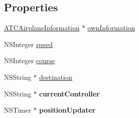 \subsection*{\-Properties}
\begin{DoxyCompactItemize}
\item 
\hyperlink{interface_a_t_c_airplane_information}{\-A\-T\-C\-Airplane\-Information} $\ast$ \hyperlink{interface_airplane_ae7aaedc8e578708c9658b88148015dfb}{own\-Information}
\item 
\-N\-S\-Integer \hyperlink{interface_airplane_a8dc93028dc827369e6f3d4944afa8ef4}{speed}
\item 
\-N\-S\-Integer \hyperlink{interface_airplane_ace9b050dac86dbd1ef53425c87e56918}{course}
\item 
\-N\-S\-String $\ast$ \hyperlink{interface_airplane_ab52b5148d157f283296221cfe90e6144}{destination}
\item 
\hypertarget{interface_airplane_a4ea2ca03397863bbddcd107098c85f76}{
\-N\-S\-String $\ast$ {\bfseries current\-Controller}}
\label{interface_airplane_a4ea2ca03397863bbddcd107098c85f76}

\item 
\hypertarget{interface_airplane_a17d86638a8f132eb42bfaf2bd22d36ec}{
\-N\-S\-Timer $\ast$ {\bfseries position\-Updater}}
\label{interface_airplane_a17d86638a8f132eb42bfaf2bd22d36ec}

\end{DoxyCompactItemize}
